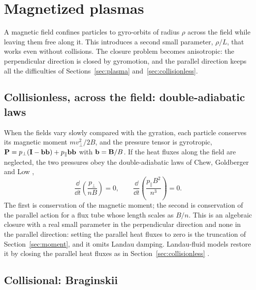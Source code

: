 \section{Magnetized plasmas}
\label{sec:mag}

A magnetic field confines particles to gyro-orbits of radius $\rho$ across
the field while leaving them free along it. This introduces a second small
parameter, $\rho/L$, that works even without collisions. The closure
problem becomes anisotropic: the perpendicular direction is closed by
gyromotion, and the parallel direction keeps all the difficulties of
Sections~\ref{sec:plasma} and~\ref{sec:collisionless}.

\subsection{Collisionless, across the field: double-adiabatic laws}

When the fields vary slowly compared with the gyration, each particle
conserves its magnetic moment $m v_\perp^2/2B$, and the pressure tensor is
gyrotropic, $\mathbf P=p_\perp(\mathbf I-\mathbf{b}\mathbf{b})+p_\parallel\mathbf{b}\mathbf{b}$ with
$\mathbf{b}=\mathbf{B}/B$. If the heat fluxes along the field are neglected, the two
pressures obey the double-adiabatic laws of Chew, Goldberger and Low
\cite{CGL56},
\begin{equation}
  \frac{\dd}{\dd t}\!\left(\frac{p_\perp}{nB}\right)=0,
  \qquad
  \frac{\dd}{\dd t}\!\left(\frac{p_\parallel B^2}{n^3}\right)=0 .
\end{equation}
The first is conservation of the magnetic moment; the second is
conservation of the parallel action for a flux tube whose length scales as
$B/n$. This is an algebraic closure with a real small parameter in the
perpendicular direction and none in the parallel direction: setting the
parallel heat fluxes to zero is the truncation of Section~\ref{sec:moment},
and it omits Landau damping. Landau-fluid models restore it by closing the
parallel heat fluxes as in Section~\ref{sec:collisionless}
\cite{Snyder97}.

\subsection{Collisional: Braginskii}


